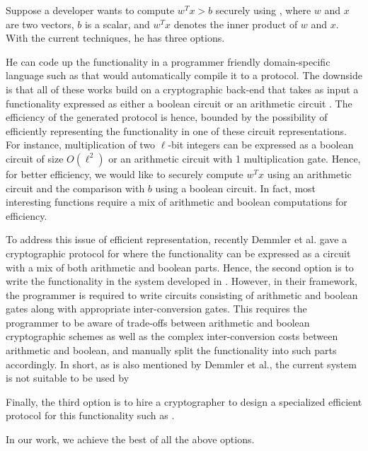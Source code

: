 Suppose a developer wants to compute $w^Tx >b$ securely using
\mpc, where $w$ and $x$ are two vectors, $b$ is a scalar, and $w^Tx$ denotes the inner product of $w$ and $x$.  With the current techniques, he has three options. 
\begin{tiret}
\item He can code up the functionality in a programmer friendly
  domain-specific language such as
  \cite{lambdaps,wysteria,oblivm,smcl,cbmcgc} that would automatically
  compile it to a \mpc protocol. The downside is that all of these
  works build on a cryptographic back-end that takes as input a functionality expressed as either a boolean circuit \cite{yao,gmw} or an arithmetic circuit \cite{homo}.
  The efficiency of the generated \mpc protocol is hence, bounded by the possibility of efficiently representing the functionality in one of these circuit representations. For instance, multiplication of two $\ell$-bit integers can be expressed as a boolean circuit of size  $O(\ell^2)$ or an arithmetic circuit with 1 multiplication gate. 
Hence, for better efficiency, we would like to securely compute $w^Tx$ using an arithmetic circuit and the comparison with $b$ using a boolean circuit. 
In fact, most interesting functions require a mix of arithmetic and boolean computations for efficiency.

\item To address this issue of efficient representation, recently Demmler et al. \cite{aby} gave a cryptographic protocol for \mpc where the functionality can be expressed as a circuit with a mix of both arithmetic and boolean parts.
Hence, the second option is to write the functionality in the system developed in \cite{aby}.
However, in their framework, the programmer is required to write circuits consisting of  arithmetic and boolean gates along with appropriate
inter-conversion gates.
This requires the programmer to be aware of
trade-offs between arithmetic and boolean cryptographic
schemes as well as the complex inter-conversion costs between arithmetic and boolean, and manually split the functionality into such parts accordingly.  
In short, as is also mentioned by Demmler et al., the current system  is not suitable
to be used by 

\item Finally, the third option is to hire a cryptographer to design a specialized efficient protocol for this functionality such as \cite{shafindss,wu,minionn}. 
\end{tiret}
In our work, we achieve the best of all the above options. 



